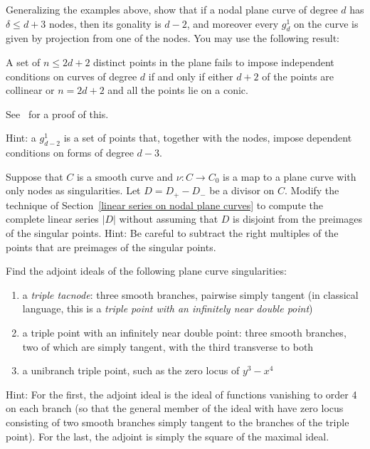 \begin{exercise}
Generalizing the examples above, show that if a nodal plane curve of degree $d$ has $\delta\leq d+3$ nodes,
then its gonality is $d-2$, and moreover every $g^1_d$ on the curve is given by projection from one of the nodes.
You may use the following result:
\begin{proposition}\label{independent conditions}
 A set of $n \leq 2d+ 2$ distinct
points in the plane fails to impose independent conditions on curves of degree
$d$ if and only if either $d + 2$ of the points  are collinear or $n = 2d + 2$ and all the points lie
on a conic.
\end{proposition} 
See~\cite[p. 302]{MR1376653} for a proof of this.

Hint: a $g^1_{d-2}$ is a set of points that, together with the nodes, impose dependent conditions on forms of degree $d-3$.
\end{exercise}

\begin{exercise}\label{general case of divisors on nodal curves}
Suppose that $C$ is a smooth curve and $\nu: C \to C_0$ is a map to a plane curve with
only nodes as singularities. Let $D = D_{+}-D_{-}$ be a divisor on $C$. Modify the 
technique of Section~\ref{linear series on nodal plane curves} to compute the complete
linear series $|D|$ without assuming that $D$ is disjoint from the preimages of the singular
points. 
Hint: Be careful to subtract the right multiples of the points that are preimages of the singular
points.
\end{exercise}


\begin{exercise}
Find the adjoint ideals of the following plane curve singularities:
\begin{enumerate}
\item a \emph{triple tacnode}: three smooth branches, pairwise simply tangent (in classical language, this is a \emph{triple point with an infinitely near double point})
\item a triple point with an infinitely near double point: three smooth branches, two of which are simply tangent, with the third transverse to both
\item a unibranch triple point, such as the zero locus of $y^3-x^4$
\end{enumerate}

Hint: For the first, the adjoint ideal is the ideal of functions vanishing to order 4 on each branch (so that the general member of the ideal with have zero locus consisting of two smooth branches simply tangent to the branches of the triple point). For the last, the adjoint is simply the square of the maximal ideal.
\end{exercise}


